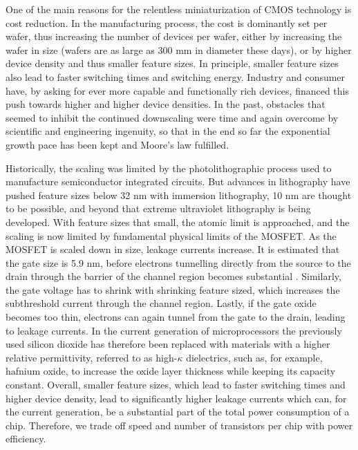 One of the main reasons for the relentless miniaturization of CMOS technology is
cost reduction. In the manufacturing process, the cost is dominantly set per
wafer, thus increasing the number of devices per wafer, either by increasing the
wafer in size (wafers are as large as 300 mm in diameter these days), or by
higher device density and thus smaller feature sizes. In principle, smaller
feature sizes also lead to faster switching times and switching energy. Industry
and consumer have, by asking for ever more capable and functionally rich
devices, financed this push towards higher and higher device densities. In the
past, obstacles that seemed to inhibit the continued downscaling were time and
again overcome by scientific and engineering ingenuity, so that in the end so
far the exponential growth pace has been kept and Moore's law fulfilled.

Historically, the scaling was limited by the photolithographic process used to
manufacture semiconductor integrated circuits. But advances in lithography have
pushed feature sizes below 32 nm with immersion lithography, 10 nm are thought
to be possible, and beyond that extreme ultraviolet lithography is being developed.
With feature sizes that small, the atomic limit is approached, and the scaling
is now limited by fundamental physical limits of the MOSFET. As the MOSFET is
scaled down in size, leakage currents increase. It is estimated that the gate
size is 5.9 nm, before electrons tunnelling directly from the source to
the drain through the barrier of the channel region becomes substantial \cite{cavin2012science}.
Similarly, the gate voltage has to shrink with shrinking feature sized, which
increases the subthreshold current through the channel region. Lastly, if the
gate oxide becomes too thin, electrons can again tunnel from the gate to the
drain, leading to leakage currents. In the current generation of microprocessors
the previously used silicon dioxide has therefore been replaced with materials
with a higher relative permittivity, referred to as high-$\kappa$ dielectrics,
such as, for example, hafnium oxide, to increase the oxide layer thickness while
keeping its capacity constant. Overall, smaller feature sizes, which lead to
faster switching times and higher device density, lead to
significantly higher leakage currents which can, for the current generation, be
a substantial part of the total power consumption of a chip. Therefore, we
trade off speed and number of transistors per chip with power efficiency.

